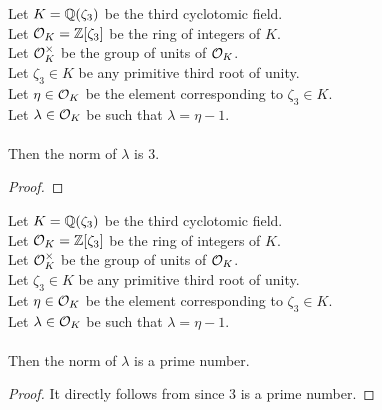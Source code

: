 \begin{lemma}
    \label{lmm:norm_lambda}
    \leanok
    Let $K = \mathbb{Q}(\zeta_3)$ be the third cyclotomic field. \\
    Let $\mathcal{O}_K = \mathbb{Z}[\zeta_3]$ be the ring of integers of $K$. \\
    Let $\mathcal{O}^\times_K$ be the group of units of $\mathcal{O}_K$. \\
    Let $\zeta_3 \in K$ be any primitive third root of unity. \\
    Let $\eta \in \mathcal{O}_K$ be the element corresponding to $\zeta_3 \in K$. \\
    Let $\lambda \in \mathcal{O}_K$ be such that $\lambda = \eta -1$. \\\\
    Then the norm of $\lambda$ is $3$.
\end{lemma}
\begin{proof}
    \leanok
\end{proof}

\begin{lemma}
    \label{lmm:norm_lambda_prime}
    \leanok
    Let $K = \mathbb{Q}(\zeta_3)$ be the third cyclotomic field. \\
    Let $\mathcal{O}_K = \mathbb{Z}[\zeta_3]$ be the ring of integers of $K$. \\
    Let $\mathcal{O}^\times_K$ be the group of units of $\mathcal{O}_K$. \\
    Let $\zeta_3 \in K$ be any primitive third root of unity. \\
    Let $\eta \in \mathcal{O}_K$ be the element corresponding to $\zeta_3 \in K$. \\
    Let $\lambda \in \mathcal{O}_K$ be such that $\lambda = \eta -1$. \\\\
    Then the norm of $\lambda$ is a prime number.
\end{lemma}
\begin{proof}
    \leanok
    It directly follows from  since $3$ is a prime number.
\end{proof}

